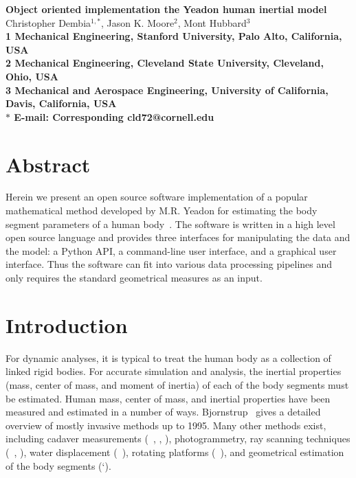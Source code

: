 \documentclass[10pt]{article}
\date{}
\begin{document}
\begin{flushleft}
{\Large
\textbf{Object oriented implementation the Yeadon human inertial model}
}
\\
Christopher Dembia$^{1,\ast}$,
Jason K. Moore$^{2}$,
Mont Hubbard$^{3}$
\\
\bf{1} Mechanical Engineering, Stanford University, Palo Alto, California, USA
\\
\bf{2} Mechanical Engineering, Cleveland State University, Cleveland, Ohio, USA
\\
\bf{3} Mechanical and Aerospace Engineering, University of California, Davis, California, USA
\\
$\ast$ E-mail: Corresponding cld72@cornell.edu
\end{flushleft}

\section*{Abstract}
Herein we present an open source software implementation of a popular
mathematical method developed by M.R. Yeadon for estimating the body segment
parameters of a human body~\cite{Yeadon1990f}. The software is written in a
high level open source language and provides three interfaces for manipulating
the data and the model: a Python API, a command-line user interface, and a
graphical user interface. Thus the software can fit into various data
processing pipelines and only requires the standard geometrical measures as an
input.

\section*{Introduction}
For dynamic analyses, it is typical to treat the human body as a collection of
linked rigid bodies. For accurate simulation and analysis, the inertial
properties (mass, center of mass, and moment of inertia) of each of the body
segments must be estimated. Human mass, center of mass, and inertial properties
have
been measured and estimated in a number of ways.
Bjornstrup~\cite{Bjornstrup1995} gives a detailed overview of mostly invasive
methods up to 1995. Many other methods exist, including cadaver measurements
(~\cite{Dempster1955}, \cite{Clauser1969}, \cite{Chandler1975}), photogrammetry,
ray scanning techniques (~\cite{Zatsiorsky1983}, \cite{Zatsiorsky1990}), water
displacement (~\cite{Park1999}), rotating platforms (~\cite{Griffiths2005}), and
geometrical estimation of the body segments (`\cite{Yeadon1990c}).
\end{document}
